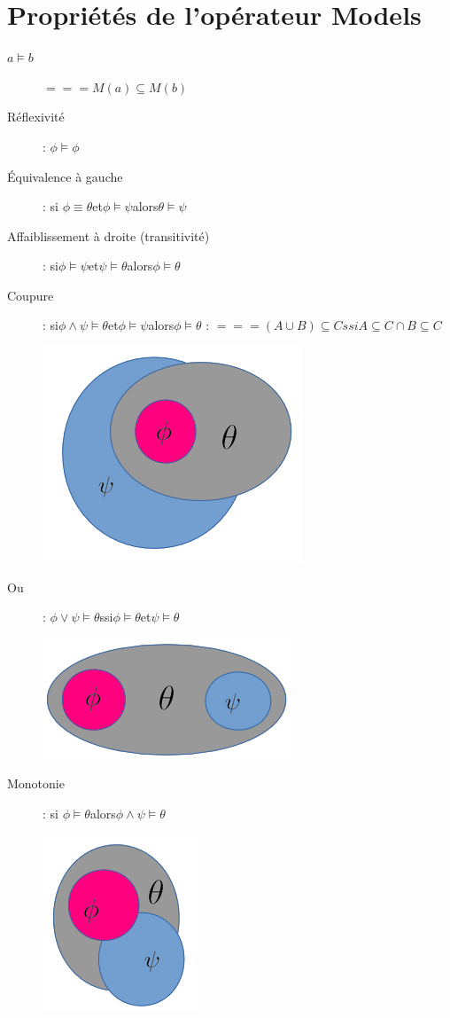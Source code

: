 \section{Propriétés de l'opérateur Models}

\begin{description}
\item[$a \models b$] $=== M(a) \subseteq M(b)$
\item[Réflexivité]: $\phi \models \phi$
\item[Équivalence à gauche]: si $\phi \equiv \theta $et$ \phi \models \psi $alors$ \theta \models \psi$
\item[Affaiblissement à droite (transitivité)]: si$ \phi \models \psi $et$ \psi \models \theta $alors$ \phi \models \theta$
\item[Coupure]: si$ \phi \wedge \psi \models \theta $et$ \phi \models \psi $alors$ \phi \models \theta$ : $=== (A \cup B) \subseteq C ssi A \subseteq C \cap B \subseteq C$
\item[] \includegraphics[scale=0.3]{img/of-coupure.png} 
\item[Ou]: $\phi \vee \psi \models \theta $ssi$ \phi \models \theta $et$ \psi \models \theta$
\item[] \includegraphics[scale=0.3]{img/of-ou.png}
\item[Monotonie]: si $\phi \models \theta $alors$ \phi \wedge \psi \models \theta$
\item[] \includegraphics[scale=0.3]{img/of-monotomie.png}
\end{description}

